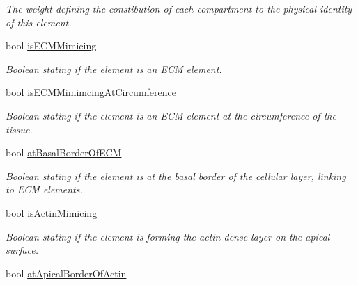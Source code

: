 \begin{DoxyCompactItemize}
\begin{DoxyCompactList}\small\item\em The weight defining the constibution of each compartment to the physical identity of this element. \end{DoxyCompactList}\item 
\hypertarget{classShapeBase_a5e442b31d2341cbe477d7c33195a576c}{}bool \hyperlink{classShapeBase_a5e442b31d2341cbe477d7c33195a576c}{is\+E\+C\+M\+Mimicing}\label{classShapeBase_a5e442b31d2341cbe477d7c33195a576c}

\begin{DoxyCompactList}\small\item\em Boolean stating if the element is an E\+C\+M element. \end{DoxyCompactList}\item 
\hypertarget{classShapeBase_aa25330a1d76d3ada08bd0dced22fb79b}{}bool \hyperlink{classShapeBase_aa25330a1d76d3ada08bd0dced22fb79b}{is\+E\+C\+M\+Mimimcing\+At\+Circumference}\label{classShapeBase_aa25330a1d76d3ada08bd0dced22fb79b}

\begin{DoxyCompactList}\small\item\em Boolean stating if the element is an E\+C\+M element at the circumference of the tissue. \end{DoxyCompactList}\item 
\hypertarget{classShapeBase_afcd1d4807f83e12b2df7606acb7518b3}{}bool \hyperlink{classShapeBase_afcd1d4807f83e12b2df7606acb7518b3}{at\+Basal\+Border\+Of\+E\+C\+M}\label{classShapeBase_afcd1d4807f83e12b2df7606acb7518b3}

\begin{DoxyCompactList}\small\item\em Boolean stating if the element is at the basal border of the cellular layer, linking to E\+C\+M elements. \end{DoxyCompactList}\item 
\hypertarget{classShapeBase_a892e478508ed8a375f0816b330e36ac1}{}bool \hyperlink{classShapeBase_a892e478508ed8a375f0816b330e36ac1}{is\+Actin\+Mimicing}\label{classShapeBase_a892e478508ed8a375f0816b330e36ac1}

\begin{DoxyCompactList}\small\item\em Boolean stating if the element is forming the actin dense layer on the apical surface. \end{DoxyCompactList}\item 
\hypertarget{classShapeBase_a95c9fe02c9c42e0617900c3282e4403a}{}bool \hyperlink{classShapeBase_a95c9fe02c9c42e0617900c3282e4403a}{at\+Apical\+Border\+Of\+Actin}\label{classShapeBase_a95c9fe02c9c42e0617900c3282e4403a}


\end{DoxyCompactItemize}
